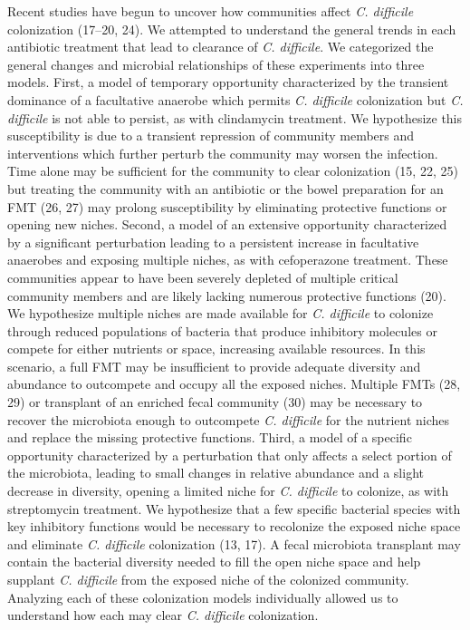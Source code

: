 \documentclass[12pt,]{article}
\begin{document}
Recent studies have begun to uncover how communities affect \emph{C.
difficile} colonization (17--20, 24). We attempted to understand the
general trends in each antibiotic treatment that lead to clearance of
\emph{C. difficile}. We categorized the general changes and microbial
relationships of these experiments into three models. First, a model of
temporary opportunity characterized by the transient dominance of a
facultative anaerobe which permits \emph{C. difficile} colonization but
\emph{C. difficile} is not able to persist, as with clindamycin
treatment. We hypothesize this susceptibility is due to a transient
repression of community members and interventions which further perturb
the community may worsen the infection. Time alone may be sufficient for
the community to clear colonization (15, 22, 25) but treating the
community with an antibiotic or the bowel preparation for an FMT (26,
27) may prolong susceptibility by eliminating protective functions or
opening new niches. Second, a model of an extensive opportunity
characterized by a significant perturbation leading to a persistent
increase in facultative anaerobes and exposing multiple niches, as with
cefoperazone treatment. These communities appear to have been severely
depleted of multiple critical community members and are likely lacking
numerous protective functions (20). We hypothesize multiple niches are
made available for \emph{C. difficile} to colonize through reduced
populations of bacteria that produce inhibitory molecules or compete for
either nutrients or space, increasing available resources. In this
scenario, a full FMT may be insufficient to provide adequate diversity
and abundance to outcompete and occupy all the exposed niches. Multiple
FMTs (28, 29) or transplant of an enriched fecal community (30) may be
necessary to recover the microbiota enough to outcompete \emph{C.
difficile} for the nutrient niches and replace the missing protective
functions. Third, a model of a specific opportunity characterized by a
perturbation that only affects a select portion of the microbiota,
leading to small changes in relative abundance and a slight decrease in
diversity, opening a limited niche for \emph{C. difficile} to colonize,
as with streptomycin treatment. We hypothesize that a few specific
bacterial species with key inhibitory functions would be necessary to
recolonize the exposed niche space and eliminate \emph{C. difficile}
colonization (13, 17). A fecal microbiota transplant may contain the
bacterial diversity needed to fill the open niche space and help
supplant \emph{C. difficile} from the exposed niche of the colonized
community. Analyzing each of these colonization models individually
allowed us to understand how each may clear \emph{C. difficile}
colonization.
\end{document}
